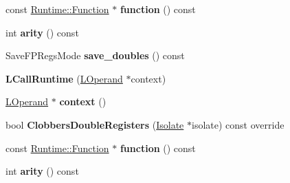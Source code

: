 \begin{DoxyCompactItemize}
\item 
const \hyperlink{structv8_1_1internal_1_1_runtime_1_1_function}{Runtime\+::\+Function} $\ast$ {\bfseries function} () const \hypertarget{classv8_1_1internal_1_1_l_call_runtime_ac92d3ff58d96d75e965c38dbbc3ae1ee}{}\label{classv8_1_1internal_1_1_l_call_runtime_ac92d3ff58d96d75e965c38dbbc3ae1ee}

\item 
int {\bfseries arity} () const \hypertarget{classv8_1_1internal_1_1_l_call_runtime_a48b7ab12a64bdad01522b517180dc1f9}{}\label{classv8_1_1internal_1_1_l_call_runtime_a48b7ab12a64bdad01522b517180dc1f9}

\item 
Save\+F\+P\+Regs\+Mode {\bfseries save\+\_\+doubles} () const \hypertarget{classv8_1_1internal_1_1_l_call_runtime_abaa882f65ae172f9475a0ae3ff632509}{}\label{classv8_1_1internal_1_1_l_call_runtime_abaa882f65ae172f9475a0ae3ff632509}

\item 
{\bfseries L\+Call\+Runtime} (\hyperlink{classv8_1_1internal_1_1_l_operand}{L\+Operand} $\ast$context)\hypertarget{classv8_1_1internal_1_1_l_call_runtime_a0944b0ab9e1843075170591acb313644}{}\label{classv8_1_1internal_1_1_l_call_runtime_a0944b0ab9e1843075170591acb313644}

\item 
\hyperlink{classv8_1_1internal_1_1_l_operand}{L\+Operand} $\ast$ {\bfseries context} ()\hypertarget{classv8_1_1internal_1_1_l_call_runtime_a53d124954c165c48517bcb9163072229}{}\label{classv8_1_1internal_1_1_l_call_runtime_a53d124954c165c48517bcb9163072229}

\item 
bool {\bfseries Clobbers\+Double\+Registers} (\hyperlink{classv8_1_1internal_1_1_isolate}{Isolate} $\ast$isolate) const  override\hypertarget{classv8_1_1internal_1_1_l_call_runtime_a4bf2712add569c33e2d6106c63c0f1ff}{}\label{classv8_1_1internal_1_1_l_call_runtime_a4bf2712add569c33e2d6106c63c0f1ff}

\item 
const \hyperlink{structv8_1_1internal_1_1_runtime_1_1_function}{Runtime\+::\+Function} $\ast$ {\bfseries function} () const \hypertarget{classv8_1_1internal_1_1_l_call_runtime_ac92d3ff58d96d75e965c38dbbc3ae1ee}{}\label{classv8_1_1internal_1_1_l_call_runtime_ac92d3ff58d96d75e965c38dbbc3ae1ee}

\item 
int {\bfseries arity} () const \hypertarget{classv8_1_1internal_1_1_l_call_runtime_a48b7ab12a64bdad01522b517180dc1f9}{}\label{classv8_1_1internal_1_1_l_call_runtime_a48b7ab12a64bdad01522b517180dc1f9}


\end{DoxyCompactItemize}
